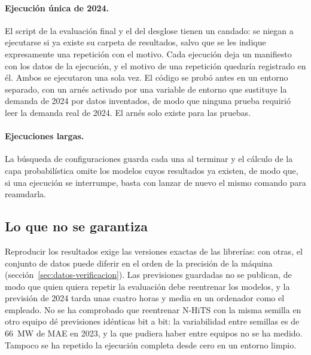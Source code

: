 \paragraph{Ejecución única de 2024.} El script de la evaluación final y el del
desglose tienen un candado: se niegan a ejecutarse si ya existe su carpeta de
resultados, salvo que se les indique expresamente una repetición con el motivo.
Cada ejecución deja un manifiesto con los datos de la ejecución, y el motivo de
una repetición quedaría registrado en él. Ambos se ejecutaron una sola vez. El
código se probó antes en un entorno separado, con un arnés activado por una
variable de entorno que sustituye la demanda de 2024 por datos inventados, de
modo que ninguna prueba requirió leer la demanda real de 2024. El arnés solo
existe para las pruebas.

\paragraph{Ejecuciones largas.} La búsqueda de configuraciones guarda cada una al
terminar y el cálculo de la capa probabilística omite los modelos cuyos
resultados ya existen, de modo que, si una ejecución se interrumpe, basta con
lanzar de nuevo el mismo comando para reanudarla.

\subsection{Lo que no se garantiza}\label{sec:entorno-limites}

Reproducir los resultados exige las versiones exactas de las librerías: con
otras, el conjunto de datos puede diferir en el orden de la precisión de la
máquina (sección~\ref{sec:datos-verificacion}). Las previsiones guardadas no se
publican, de modo que quien quiera repetir la evaluación debe reentrenar los
modelos, y la previsión de 2024 tarda unas cuatro horas y media en un
ordenador como el empleado. No se ha comprobado que reentrenar N-HiTS con la
misma semilla en otro equipo dé previsiones idénticas bit a bit: la variabilidad
entre semillas es de 66~MW de MAE en 2023, y la que pudiera haber entre equipos
no se ha medido.
Tampoco se ha repetido la ejecución completa desde cero en un entorno limpio.
